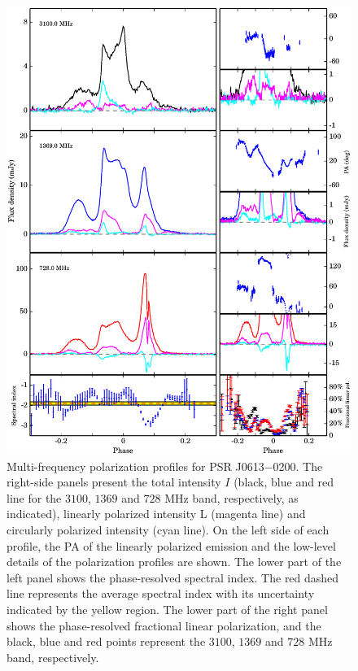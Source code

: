 \documentclass[useAMS,usenatbib]{mn2e}
\begin{document}
\begin{figure}
\begin{center}
\includegraphics[width=6 in]{0613.ps}
\caption{Multi-frequency polarization profiles for PSR J0613$-$0200. 
The right-side panels present the total intensity $I$ (black, blue and red
line for the $3100$, $1369$ and $728$ MHz band, respectively, as 
indicated), linearly polarized intensity L (magenta line) and circularly 
polarized intensity (cyan line).
%
On the left side of each profile, the PA of the linearly polarized 
emission and the low-level details of the polarization profiles are 
shown.
%
The lower part of the left panel shows the phase-resolved spectral index. 
The red dashed line represents the average spectral index with its uncertainty 
indicated by the yellow region.
%
The lower part of the right panel shows the phase-resolved fractional linear 
polarization, and the black, blue and red points represent the $3100$, $1369$ 
and $728$ MHz band, respectively. 
}
\label{0613}
\end{center}
\end{figure}
\end{document}
